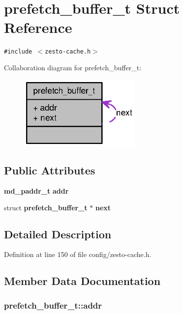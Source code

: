 \section{prefetch\_\-buffer\_\-t Struct Reference}
\label{structprefetch__buffer__t}
{\tt \#include $<$zesto-cache.h$>$}

Collaboration diagram for prefetch\_\-buffer\_\-t:\nopagebreak
\begin{figure}[H]
\begin{center}
\leavevmode
\includegraphics[width=169pt]{structprefetch__buffer__t__coll__graph}
\end{center}
\end{figure}
\subsection*{Public Attributes}
\begin{CompactItemize}
\item 
{\bf md\_\-paddr\_\-t} {\bf addr}
\item 
struct {\bf prefetch\_\-buffer\_\-t} $\ast$ {\bf next}
\end{CompactItemize}


\subsection{Detailed Description}


Definition at line 150 of file config/zesto-cache.h.

\subsection{Member Data Documentation}
\subsubsection[{addr}]{ {\bf prefetch\_\-buffer\_\-t::addr}}\label{structprefetch__buffer__t_0d966a7c34c46e1ed54a03e722acce9f}




